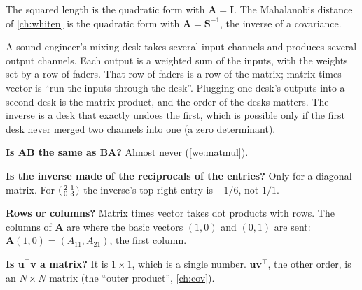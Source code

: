 \documentclass[11pt,a4paper,oneside,openany]{book}
\newcommand{\B}[1]{{\symbf{#1}}}
\newcommand{\B}[1]{{\bm{#1}}}
\newcommand{\T}{^{\top}}
\newcommand{\vu}{\B{u}}
\newcommand{\vv}{\B{v}}
\newcommand{\mS}{\B{S}}
\newcommand{\mI}{\B{I}}
\newcommand{\mA}{\B{A}}
\newcommand{\mB}{\B{B}}
\begin{document}
The squared length is the quadratic form with $\mA=\mI$. The Mahalanobis distance of \cref{ch:whiten} is the quadratic form
with $\mA=\mS^{-1}$, the inverse of a covariance.

\begin{analogy}
A sound engineer's mixing desk takes several input channels and produces several output channels. Each output is a
weighted sum of the inputs, with the weights set by a row of faders. That row of faders is a row of the matrix; matrix
times vector is ``run the inputs through the desk''. Plugging one desk's outputs into a second desk is the matrix product,
and the order of the desks matters. The inverse is a desk that exactly undoes the first, which is possible only if the
first desk never merged two channels into one (a zero determinant).
\end{analogy}

\begin{confusions}
\textbf{Is $\mA\mB$ the same as $\mB\mA$?} Almost never (\cref{we:matmul}).

\textbf{Is the inverse made of the reciprocals of the entries?} Only for a diagonal matrix. For
$\begin{psmallmatrix}2&1\\0&3\end{psmallmatrix}$ the inverse's top-right entry is $-1/6$, not $1/1$.

\textbf{Rows or columns?} Matrix times vector takes dot products with rows. The columns of $\mA$ are where the basic vectors
$(1,0)$ and $(0,1)$ are sent: $\mA(1,0)=(A_{11},A_{21})$, the first column.

\textbf{Is $\vu\T\vv$ a matrix?} It is $1\times1$, which is a single number. $\vu\vv\T$, the other order, is an $N\times N$
matrix (the ``outer product'', \cref{ch:cov}).
\end{confusions}
\end{document}
